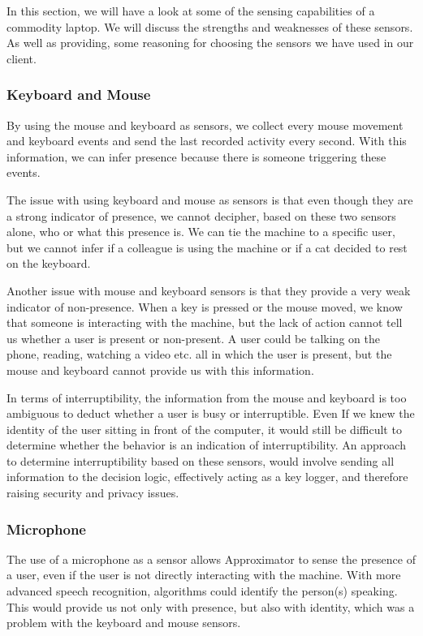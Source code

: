 \documentclass{sigchi}
\begin{document}
In this section, we will have a look at some of the sensing capabilities of a commodity laptop.
We will discuss the strengths and weaknesses of these sensors.
As well as providing, some reasoning for choosing the sensors we have used in our client.

\subsubsection{Keyboard and Mouse}
By using the mouse and keyboard as sensors, we collect every mouse movement and keyboard events and send the last recorded activity every second.
With this information, we can infer presence because there is someone triggering these events.

The issue with using keyboard and mouse as sensors is that even though they are a strong indicator of presence, we cannot decipher, based on these two sensors alone, who or what this presence is.
We can tie the machine to a specific user, but we cannot infer if a colleague is using the machine or if a cat decided to rest on the keyboard.

Another issue with mouse and keyboard sensors is that they provide a very weak indicator of non-presence.
When a key is pressed or the mouse moved, we know that someone is interacting with the machine, but the lack of action cannot tell us whether a user is present or non-present.
A user could be talking on the phone, reading, watching a video etc. all in which the user is present, but the mouse and keyboard cannot provide us with this information.

In terms of interruptibility, the information from the mouse and keyboard is too ambiguous to deduct whether a user is busy or interruptible.
Even If we knew the identity of the user sitting in front of the computer, it would still be difficult to determine whether the behavior is an indication of interruptibility.
An approach to determine interruptibility based on these sensors, would involve sending all information to the decision logic, effectively acting as a key logger, and therefore raising security and privacy issues.

\subsubsection{Microphone}
The use of a microphone as a sensor allows Approximator to sense the presence of a user, even if the user is not directly interacting with the machine.
With more advanced speech recognition, algorithms could identify the person(s) speaking.
This would provide us not only with presence, but also with identity, which was a problem with the keyboard and mouse sensors.
\end{document}
